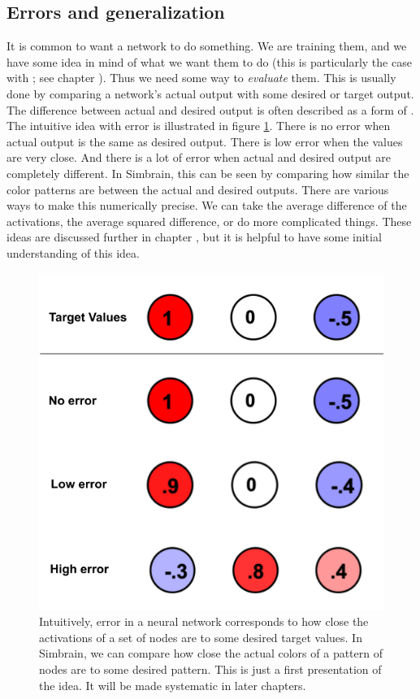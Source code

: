\subsection{Errors and generalization}\label{evaluatingNN}

It is common to want a network to do something. We are training them, and we have some idea in mind of what we want them to do (this is particularly the case with ; see chapter ). Thus we need some way to \emph{evaluate} them. This is usually done by comparing a network's actual output with some desired or target output. The difference between actual and desired output is often described as a form of . The intuitive idea with error is illustrated in figure \ref{intuitiveError}. There is no error when actual output is the same as desired output. There is low error when the values are very close. And there is a lot of error when actual and desired output are completely different. In Simbrain, this can be seen by comparing how similar the color patterns are between the actual and desired outputs. There are various ways to make this numerically precise. We can take the average difference of the activations, the average squared difference, or do more complicated things. These ideas are discussed further in chapter , but it is helpful to have some initial understanding of this idea. 

\begin{figure}[h]
\centering
\includegraphics[scale=.3]{./images/ErrorIntuitive.png}
\caption[Jeff Yoshimi.]{Intuitively, error in a neural network corresponds to how close the activations of a set of nodes are to some desired target values. In Simbrain, we can compare how close the actual colors of a pattern of nodes are to some desired pattern.  This is just a first presentation of the idea. It will be made systematic in later chapters.}
\label{intuitiveError}
\end{figure}

